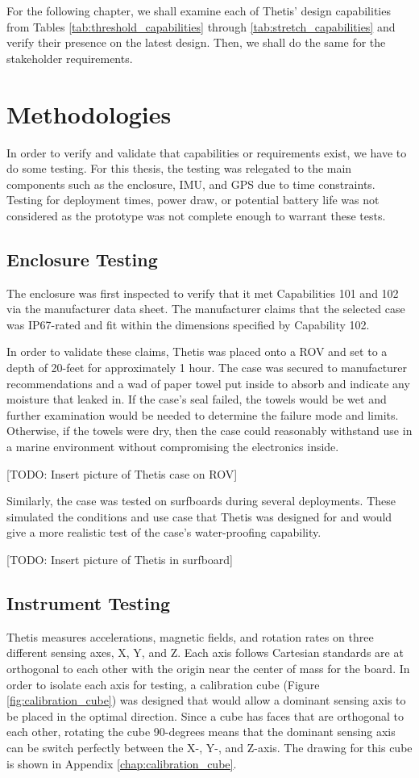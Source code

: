 For the following chapter, we shall examine each of Thetis' design capabilities from Tables \ref{tab:threshold_capabilities} through \ref{tab:stretch_capabilities} and verify their presence on the latest design.
Then, we shall do the same for the stakeholder requirements.

\section{Methodologies}
In order to verify and validate that capabilities or requirements exist, we have to do some testing.
For this thesis, the testing was relegated to the main components such as the enclosure, IMU, and GPS due to time constraints.
Testing for deployment times, power draw, or potential battery life was not considered as the prototype was not complete enough to warrant these tests.

\subsection{Enclosure Testing}
The enclosure was first inspected to verify that it met Capabilities 101 and 102 via the manufacturer data sheet.
The manufacturer claims that the selected case was IP67-rated and fit within the dimensions specified by Capability 102.

In order to validate these claims, Thetis was placed onto a ROV and set to a depth of 20-feet for approximately 1 hour.
The case was secured to manufacturer recommendations and a wad of paper towel put inside to absorb and indicate any moisture that leaked in.
If the case's seal failed, the towels would be wet and further examination would be needed to determine the failure mode and limits.
Otherwise, if the towels were dry, then the case could reasonably withstand use in a marine environment without compromising the electronics inside.

[TODO: Insert picture of Thetis case on ROV]

Similarly, the case was tested on surfboards during several deployments.
These simulated the conditions and use case that Thetis was designed for and would give a more realistic test of the case's water-proofing capability.

[TODO: Insert picture of Thetis in surfboard]

\subsection{Instrument Testing}
Thetis measures accelerations, magnetic fields, and rotation rates on three different sensing axes, X, Y, and Z.
Each axis follows Cartesian standards are at orthogonal to each other with the origin near the center of mass for the board.
In order to isolate each axis for testing, a calibration cube (Figure \ref{fig:calibration_cube}) was designed that would allow a dominant sensing axis to be placed in the optimal direction.
Since a cube has faces that are orthogonal to each other, rotating the cube 90-degrees means that the dominant sensing axis can be switch perfectly between the X-, Y-, and Z-axis.
The drawing for this cube is shown in Appendix \ref{chap:calibration_cube}. 

